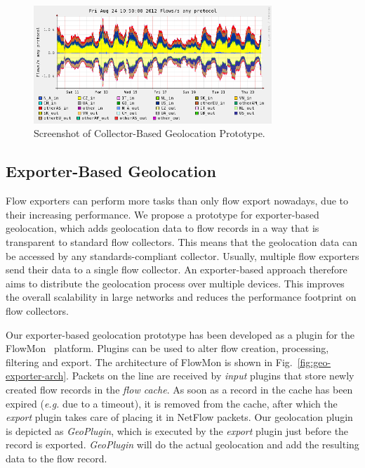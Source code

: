 \begin{figure}[!tb]
    \centering
    \includegraphics[width=0.8\textwidth]{figures/paper-geolocation/nfgeodump.png}
    \caption{Screenshot of Collector-Based Geolocation Prototype.}
    \label{fig:geo-nfgeodump_screenshot}
\end{figure}

\subsection{Exporter-Based Geolocation} \label{subsec:geo-exporter_based_geolocation}

Flow exporters can perform more tasks than only flow export nowadays, due to their increasing performance. We propose a prototype for exporter-based geolocation, which adds geolocation data to flow records in a way that is transparent to standard flow collectors. This means that the geolocation data can be accessed by any standards-compliant collector. Usually, multiple flow exporters send their data to a single flow collector. An exporter-based approach therefore aims to distribute the geolocation process over multiple devices. This improves the overall scalability in large networks and reduces the performance footprint on flow collectors.

Our exporter-based geolocation prototype has been developed as a plugin for the FlowMon~\cite{FlowmonNetworks--Flowmon} platform. Plugins can be used to alter flow creation, processing, filtering and export. The architecture of FlowMon is shown in Fig.~\ref{fig:geo-exporter-arch}. Packets on the line are received by \textit{input} plugins that store newly created flow records in the \textit{flow cache}. As soon as a record in the cache has been expired (\textit{e.g.} due to a timeout), it is removed from the cache, after which the \textit{export} plugin takes care of placing it in NetFlow packets. Our geolocation plugin is depicted as \textit{GeoPlugin}, which is executed by the \textit{export} plugin just before the record is exported. \textit{GeoPlugin} will do the actual geolocation and add the resulting data to the flow record.

